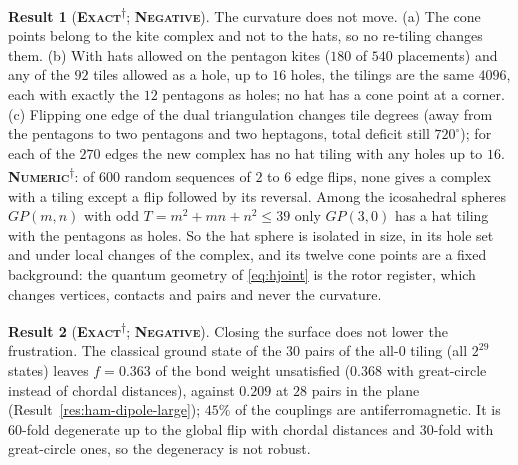 \documentclass[11pt]{article}
\newcommand{\exact}{\textbf{\textsc{Exact}}}
\newcommand{\numeric}{\textbf{\textsc{Numeric}}}
\newcommand{\negres}{\textbf{\textsc{Negative}}}
\newcommand{\snap}{\textsuperscript{$\dagger$}}      %
\theoremstyle{definition}
\newtheorem{result}{Result}
\begin{document}
\begin{result}[\exact\snap; \negres]\label{res:sphere-frozen}
The curvature does not move. (a) The cone points belong to the kite complex and not to the hats, so no re-tiling changes them. (b) With hats allowed on the pentagon kites ($180$ of $540$ placements) and any of the $92$ tiles allowed as a hole, up to $16$ holes, the tilings are the same $4096$, each with exactly the $12$ pentagons as holes; no hat has a cone point at a corner. (c) Flipping one edge of the dual triangulation changes tile degrees (away from the pentagons to two pentagons and two heptagons, total deficit still $720^\circ$); for each of the $270$ edges the new complex has no hat tiling with any holes up to $16$. \numeric\snap: of $600$ random sequences of $2$ to $6$ edge flips, none gives a complex with a tiling except a flip followed by its reversal. Among the icosahedral spheres $GP(m,n)$ with odd $T=m^2+mn+n^2\le39$ only $GP(3,0)$ has a hat tiling with the pentagons as holes. So the hat sphere is isolated in size, in its hole set and under local changes of the complex, and its twelve cone points are a fixed background: the quantum geometry of \eqref{eq:hjoint} is the rotor register, which changes vertices, contacts and pairs and never the curvature.
\end{result}
\begin{result}[\exact\snap; \negres]\label{res:sphere-frust}
Closing the surface does not lower the frustration. The classical ground state of the $30$ pairs of the all-$0$ tiling (all $2^{29}$ states) leaves $f=0.363$ of the bond weight unsatisfied ($0.368$ with great-circle instead of chordal distances), against $0.209$ at $28$ pairs in the plane (Result~\ref{res:ham-dipole-large}); $45\%$ of the couplings are antiferromagnetic. It is $60$-fold degenerate up to the global flip with chordal distances and $30$-fold with great-circle ones, so the degeneracy is not robust.
\end{result}
\end{document}

